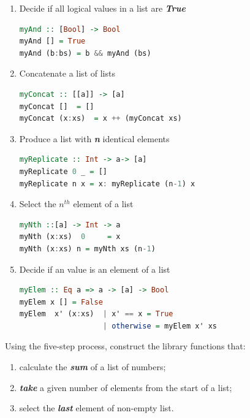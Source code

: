 \documentclass{article}
\begin{document}
\begin{solution}
\begin{enumerate}
	\item Decide if all logical values in a list are \textbf{\textit{True}}
	\begin{lstlisting}[language=Haskell]
myAnd :: [Bool] -> Bool
myAnd [] = True
myAnd (b:bs) = b && myAnd (bs)
	\end{lstlisting}
	\item Concatenate a list of lists
\begin{lstlisting}[language=Haskell]
myConcat :: [[a]] -> [a] 
myConcat []  = []
myConcat (x:xs)  = x ++ (myConcat xs)
\end{lstlisting}
	\item Produce a list with \textbf{\textit{n}} identical elements
\begin{lstlisting}[language=Haskell]
myReplicate :: Int -> a-> [a]
myReplicate 0 _ = []
myReplicate n x = x: myReplicate (n-1) x
\end{lstlisting}
	\item Select the $n^{th}$ element of a list
\begin{lstlisting}[language=Haskell]
myNth ::[a] -> Int -> a
myNth (x:xs)  0     = x
myNth (x:xs) n = myNth xs (n-1)
\end{lstlisting}
	\item Decide if an value is an element of a list
\begin{lstlisting}[language=Haskell]
myElem :: Eq a => a -> [a] -> Bool
myElem x [] = False
myElem  x' (x:xs)  | x' == x = True
                   | otherwise = myElem x' xs
\end{lstlisting}
 \end{enumerate}
 \end{solution}
 
 \begin{exercise}
Using the five-step process, construct the library functions that: 
\begin{enumerate}
	\item calculate the \textbf{\textit{sum}} of a list of numbers;
	\item \textbf{\textit{take}} a given number of elements from the start of a list;
	\item select the \textbf{\textit{last}} element of non-empty list.
\end{enumerate}

\end{exercise}
\end{document}
